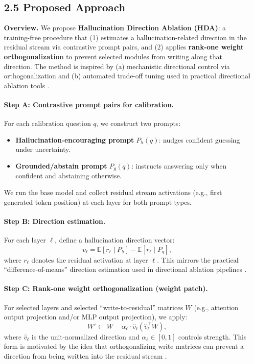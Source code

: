 
\subsection*{2.5 Proposed Approach}

\textbf{Overview.} We propose \textbf{Hallucination Direction Ablation (HDA)}: a training-free procedure that (1) estimates a hallucination-related direction in the residual stream via contrastive prompt pairs, and (2) applies \textbf{rank-one weight orthogonalization} to prevent selected modules from writing along that direction. The method is inspired by (a) mechanistic directional control via orthogonalization \citep{arditi2024refusal} and (b) automated trade-off tuning used in practical directional ablation tools \citep{heretic}.

\paragraph{Step A: Contrastive prompt pairs for calibration.}
For each calibration question $q$, we construct two prompts:
\begin{itemize}
  \item \textbf{Hallucination-encouraging prompt} $P_h(q)$: nudges confident guessing under uncertainty.
  \item \textbf{Grounded/abstain prompt} $P_g(q)$: instructs answering only when confident and abstaining otherwise.
\end{itemize}
We run the base model and collect residual stream activations (e.g., first generated token position) at each layer for both prompt types.

\paragraph{Step B: Direction estimation.}
For each layer $\ell$, define a hallucination direction vector:
\[
v_\ell = \mathbb{E}[r_\ell \mid P_h] - \mathbb{E}[r_\ell \mid P_g],
\]
where $r_\ell$ denotes the residual activation at layer $\ell$. This mirrors the practical “difference-of-means” direction estimation used in directional ablation pipelines \citep{heretic}.

\paragraph{Step C: Rank-one weight orthogonalization (weight patch).}
For selected layers and selected “write-to-residual” matrices $W$ (e.g., attention output projection and/or MLP output projection), we apply:
\[
W' \leftarrow W - \alpha_\ell \cdot \hat{v}_\ell \left(\hat{v}_\ell^\top W\right),
\]
where $\hat{v}_\ell$ is the unit-normalized direction and $\alpha_\ell \in [0,1]$ controls strength. This form is motivated by the idea that orthogonalizing write matrices can prevent a direction from being written into the residual stream \citep{arditi2024refusal}.

